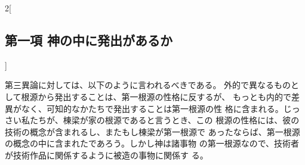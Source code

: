 \documentclass[paper=a4paper,fontsize=10pt,jafontsize=9pt,titlepage]{jlreq}
\begin{document}
\begin{paracol}{2}[\subsection{第一項 神の中に発出があるか}]
\switchcolumn


第三異論に対しては、以下のように言われるべきである。
外的で異なるものとして根源から発出することは、第一根源の性格に反するが、
 もっとも内的で差異がなく、可知的なかたちで発出することは第一根源の性
 格に含まれる。じっさい私たちが、棟梁が家の根源であると言うとき、この
 根源の性格には、彼の技術の概念が含まれるし、またもし棟梁が第一根源で
 あったならば、第一根源の概念の中に含まれたであろう。しかし神は諸事物
 の第一根源なので、技術者が技術作品に関係するように被造の事物に関係す
 る。


\switchcolumn*



\end{paracol}
\newpage




\end{document}
